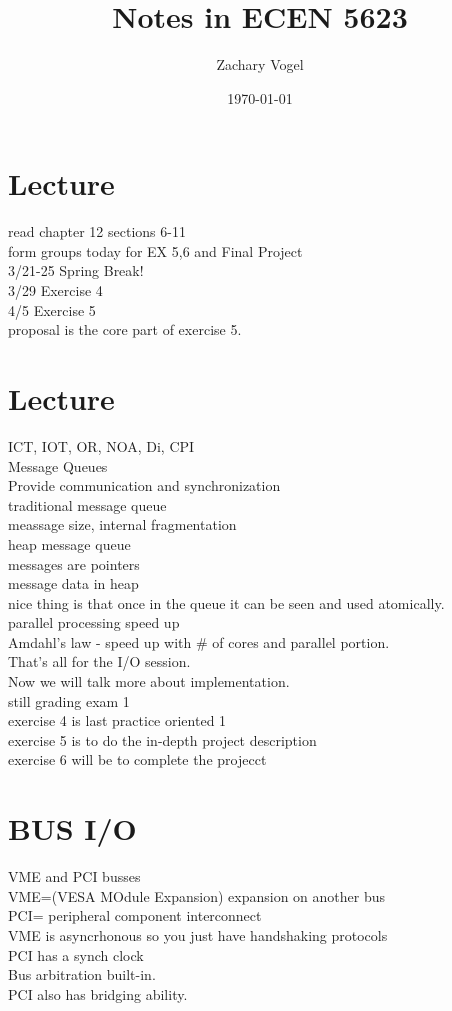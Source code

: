 \documentclass{article}
\author{Zachary Vogel}
\date{\today}
\title{Notes in ECEN 5623}
\begin{document}
\maketitle


\section*{Lecture}
read chapter 12 sections 6-11\\

form groups today for EX 5,6 and Final Project\\
3/21-25 Spring Break!\\
3/29 Exercise 4\\
4/5 Exercise 5\\

proposal is the core part of exercise 5.\\

\section*{Lecture}
ICT, IOT, OR, NOA, Di, CPI\\

Message Queues\\
Provide communication and synchronization\\
traditional message queue\\
meassage size, internal fragmentation\\
heap message queue\\
messages are pointers\\
message data in heap\\

nice thing is that once in the queue it can be seen and used atomically.\\
parallel processing speed up\\

Amdahl's law - speed up with \# of cores and parallel portion.\\
That's all for the I/O session.\\

Now we will talk more about implementation.\\
still grading exam 1\\
exercise 4 is last practice oriented 1\\
exercise 5 is to do the in-depth project description\\
exercise 6 will be to complete the projecct\\


\section*{BUS I/O}
VME and PCI busses\\
VME=(VESA MOdule Expansion) expansion on another bus\\
PCI= peripheral component interconnect\\
VME is asyncrhonous so you just have handshaking protocols\\
PCI has a synch clock\\
Bus arbitration built-in.\\
PCI also has bridging ability.\\
\end{document}
